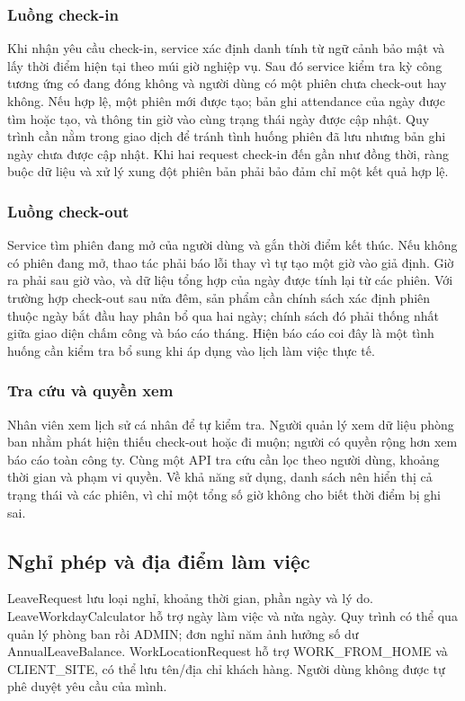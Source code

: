 \documentclass[12pt,a4paper,oneside]{report}
\begin{document}
\subsubsection{Luồng check-in}
Khi nhận yêu cầu check-in, service xác định danh tính từ ngữ cảnh bảo mật và lấy thời điểm hiện tại theo múi giờ nghiệp vụ. Sau đó service kiểm tra kỳ công tương ứng có đang đóng không và người dùng có một phiên chưa check-out hay không. Nếu hợp lệ, một phiên mới được tạo; bản ghi attendance của ngày được tìm hoặc tạo, và thông tin giờ vào cùng trạng thái ngày được cập nhật. Quy trình cần nằm trong giao dịch để tránh tình huống phiên đã lưu nhưng bản ghi ngày chưa được cập nhật. Khi hai request check-in đến gần như đồng thời, ràng buộc dữ liệu và xử lý xung đột phiên bản phải bảo đảm chỉ một kết quả hợp lệ.

\subsubsection{Luồng check-out}
Service tìm phiên đang mở của người dùng và gắn thời điểm kết thúc. Nếu không có phiên đang mở, thao tác phải báo lỗi thay vì tự tạo một giờ vào giả định. Giờ ra phải sau giờ vào, và dữ liệu tổng hợp của ngày được tính lại từ các phiên. Với trường hợp check-out sau nửa đêm, sản phẩm cần chính sách xác định phiên thuộc ngày bắt đầu hay phân bổ qua hai ngày; chính sách đó phải thống nhất giữa giao diện chấm công và báo cáo tháng. Hiện báo cáo coi đây là một tình huống cần kiểm tra bổ sung khi áp dụng vào lịch làm việc thực tế.

\subsubsection{Tra cứu và quyền xem}
Nhân viên xem lịch sử cá nhân để tự kiểm tra. Người quản lý xem dữ liệu phòng ban nhằm phát hiện thiếu check-out hoặc đi muộn; người có quyền rộng hơn xem báo cáo toàn công ty. Cùng một API tra cứu cần lọc theo người dùng, khoảng thời gian và phạm vi quyền. Về khả năng sử dụng, danh sách nên hiển thị cả trạng thái và các phiên, vì chỉ một tổng số giờ không cho biết thời điểm bị ghi sai.

\subsection{Nghỉ phép và địa điểm làm việc}
LeaveRequest lưu loại nghỉ, khoảng thời gian, phần ngày và lý do. LeaveWorkdayCalculator hỗ trợ ngày làm việc và nửa ngày. Quy trình có thể qua quản lý phòng ban rồi ADMIN; đơn nghỉ năm ảnh hưởng số dư AnnualLeaveBalance. WorkLocationRequest hỗ trợ WORK\_FROM\_HOME và CLIENT\_SITE, có thể lưu tên/địa chỉ khách hàng. Người dùng không được tự phê duyệt yêu cầu của mình.
\end{document}
